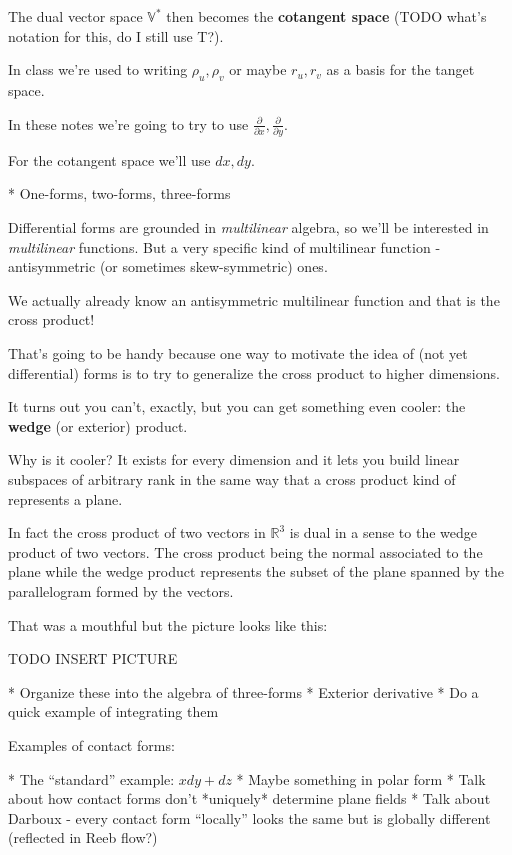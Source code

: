 \documentclass{article}
\begin{document}
The dual vector space $\mathbb{V}^{*}$ then becomes the \textbf{cotangent space}
(TODO what's notation for this, do I still use T?).

In class we're used to writing $\rho_{u}, \rho_{v}$ or maybe $r_{u}, r_{v}$ as a
basis for the tanget space.

In these notes we're going to try to use $\frac{\partial}{\partial x}, \frac{\partial}{\partial
  y}$.

For the cotangent space we'll use $dx, dy$.

* One-forms, two-forms, three-forms

Differential forms are grounded in \textit{multilinear} algebra, so we'll be
interested in \textit{multilinear} functions. But a very specific kind of
multilinear function - antisymmetric (or sometimes skew-symmetric) ones.

We actually already know an antisymmetric multilinear function and that is the
cross product!

That's going to be handy because one way to motivate the idea of (not yet
differential) forms is to try to generalize the cross product to higher
dimensions.

It turns out you can't, exactly, but you can get something even cooler: the
\textbf{wedge} (or exterior) product.

Why is it cooler? It exists for every dimension and it lets you build linear
subspaces of arbitrary rank in the same way that a cross product kind of
represents a plane.

In fact the cross product of two vectors in $\mathbb{R}^{3}$
is dual in a sense to the wedge product of two vectors. The cross product being
the normal associated to the plane while the wedge product represents the subset
of the plane spanned by the parallelogram formed by the vectors.

That was a mouthful but the picture looks like this:

TODO INSERT PICTURE

* Organize these into the algebra of three-forms
* Exterior derivative
* Do a quick example of integrating them

Examples of contact forms:

* The ``standard'' example: $xdy + dz$
* Maybe something in polar form
* Talk about how contact forms don't *uniquely* determine plane fields
* Talk about Darboux - every contact form ``locally'' looks the same but is
globally different (reflected in Reeb flow?)
\end{document}
